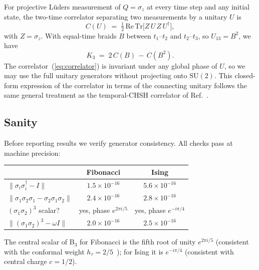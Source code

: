 \documentclass[aps,prx,reprint,amsmath,amssymb,floatfix,nofootinbib,superscriptaddress]{revtex4-2}
\begin{document}
For projective L\"uders measurement of $Q=\sigma_{z}$ at every time
step and any initial state, the two-time correlator separating two
measurements by a unitary $U$ is
\begin{equation}
  C(U) \;=\; \tfrac{1}{2}\,\mathrm{Re}\,\mathrm{Tr}\bigl[Z\,U\,Z\,U^{\dagger}\bigr],
\label{eq:correlator}
\end{equation}
with $Z=\sigma_{z}$. With equal-time braids $B$ between $t_{1}$--$t_{2}$
and $t_{2}$--$t_{3}$, so $U_{13}=B^{2}$, we have
\begin{equation}
  K_{3} \;=\; 2\,C(B) \,-\, C(B^{2}).
\end{equation}
The correlator~(\ref{eq:correlator}) is invariant under any global
phase of $U$, so we may use the full unitary generators without
projecting onto $\mathrm{SU}(2)$. This closed-form expression of the
correlator in terms of the connecting unitary follows the same
general treatment as the temporal-CHSH correlator of
Ref.~\cite{Fritz2010}.

\subsection{Sanity}

Before reporting results we verify generator consistency. All checks
pass at machine precision:
\begin{center}\small
\begin{tabular}{lcc}
\toprule
& Fibonacci & Ising \\
\midrule
$\|\sigma_{i}\sigma_{i}^{\dagger}-I\|$ & $1.5\times10^{-16}$ & $5.6\times10^{-16}$ \\
$\|\sigma_{1}\sigma_{2}\sigma_{1}-\sigma_{2}\sigma_{1}\sigma_{2}\|$
                                      & $2.4\times10^{-16}$ & $2.8\times10^{-16}$ \\
$(\sigma_{1}\sigma_{2})^{3}$ scalar?  & yes, phase $e^{2\pi i/5}$
                                      & yes, phase $e^{-i\pi/4}$ \\
$\|(\sigma_{1}\sigma_{2})^{3}-\omega I\|$
                                      & $2.0\times10^{-16}$ & $2.5\times10^{-16}$ \\
\bottomrule
\end{tabular}
\end{center}
The central scalar of B$_{3}$ for Fibonacci is the fifth root of unity
$e^{2\pi i/5}$ (consistent with the conformal weight
$h_{\tau} = 2/5$~\cite{NayakSimonStern2008}); for Ising it is
$e^{-i\pi/4}$ (consistent with central charge $c=1/2$).
\end{document}
